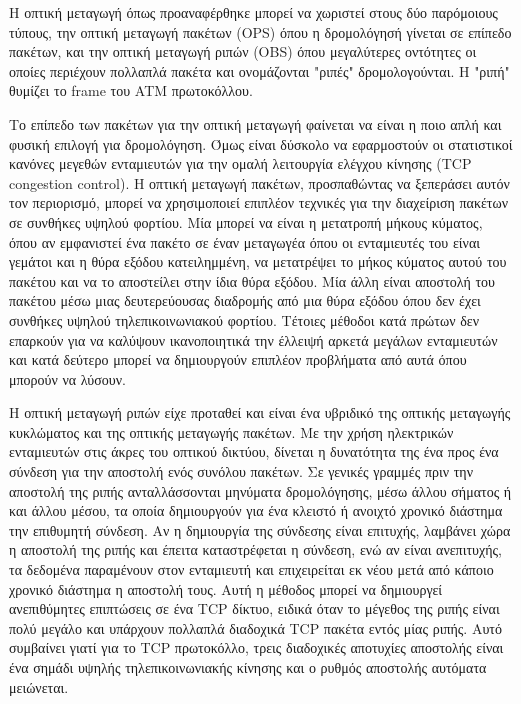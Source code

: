Η οπτική μεταγωγή όπως προαναφέρθηκε μπορεί να χωριστεί στους δύο
παρόμοιους τύπους, την οπτική μεταγωγή πακέτων (OPS) όπου η
δρομολόγησή γίνεται σε επίπεδο πακέτων, και την οπτική μεταγωγή ριπών
(OBS) όπου μεγαλύτερες οντότητες οι οποίες περιέχουν πολλαπλά πακέτα
και ονομάζονται "ριπές" δρομολογούνται. Η "ριπή" θυμίζει το frame του
ATM πρωτοκόλλου.

Το επίπεδο των πακέτων για την οπτική μεταγωγή φαίνεται να είναι η
ποιο απλή και φυσική επιλογή για δρομολόγηση. Όμως είναι δύσκολο να
εφαρμοστούν οι στατιστικοί κανόνες μεγεθών ενταμιευτών για την ομαλή
λειτουργία ελέγχου κίνησης (TCP congestion control). Η οπτική μεταγωγή
πακέτων, προσπαθώντας να ξεπεράσει αυτόν τον περιορισμό, μπορεί να
χρησιμοποιεί επιπλέον τεχνικές για την διαχείριση πακέτων σε συνθήκες
υψηλού φορτίου. Μία μπορεί να είναι η μετατροπή μήκους κύματος, όπου
αν εμφανιστεί ένα πακέτο σε έναν μεταγωγέα όπου οι ενταμιευτές του
είναι γεμάτοι και η θύρα εξόδου κατειλημμένη, να μετατρέψει το μήκος
κύματος αυτού του πακέτου και να το αποστείλει στην ίδια θύρα
εξόδου. Μία άλλη είναι αποστολή του πακέτου μέσω μιας δευτερεύουσας
διαδρομής από μια θύρα εξόδου όπου δεν έχει συνθήκες υψηλού
τηλεπικοινωνιακού φορτίου. Τέτοιες μέθοδοι κατά πρώτων δεν επαρκούν
για να καλύψουν ικανοποιητικά την έλλειψή αρκετά μεγάλων ενταμιευτών
και κατά δεύτερο μπορεί να δημιουργούν επιπλέον προβλήματα από αυτά
όπου μπορούν να λύσουν.

Η οπτική μεταγωγή ριπών είχε προταθεί και είναι ένα υβριδικό της
οπτικής μεταγωγής κυκλώματος και της οπτικής μεταγωγής πακέτων. Με την
χρήση ηλεκτρικών ενταμιευτών στις άκρες του οπτικού δικτύου, δίνεται η
δυνατότητα της ένα προς ένα σύνδεση για την αποστολή ενός συνόλου
πακέτων. Σε γενικές γραμμές πριν την αποστολή της ριπής ανταλλάσσονται
μηνύματα δρομολόγησης, μέσω άλλου σήματος ή και άλλου μέσου, τα οποία
δημιουργούν για ένα κλειστό ή ανοιχτό χρονικό διάστημα την επιθυμητή
σύνδεση. Αν η δημιουργία της σύνδεσης είναι επιτυχής, λαμβάνει χώρα η
αποστολή της ριπής και έπειτα καταστρέφεται η σύνδεση, ενώ αν είναι
ανεπιτυχής, τα δεδομένα παραμένουν στον ενταμιευτή και επιχειρείται εκ
νέου μετά από κάποιο χρονικό διάστημα η αποστολή τους. Αυτή η μέθοδος
μπορεί να δημιουργεί ανεπιθύμητες επιπτώσεις σε ένα TCP δίκτυο, ειδικά
όταν το μέγεθος της ριπής είναι πολύ μεγάλο και υπάρχουν πολλαπλά
διαδοχικά TCP πακέτα εντός μίας ριπής. Αυτό συμβαίνει γιατί για το TCP
πρωτοκόλλο, τρεις διαδοχικές αποτυχίες αποστολής είναι ένα σημάδι
υψηλής τηλεπικοινωνιακής κίνησης και ο ρυθμός αποστολής αυτόματα
μειώνεται.

